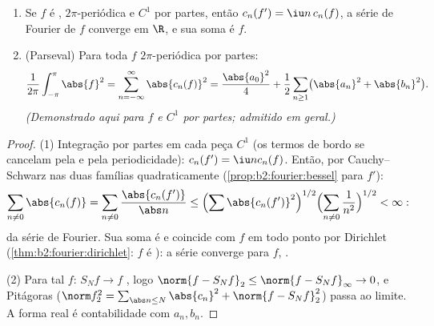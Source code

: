 \begin{theorem}\label{thm:b2:fourier:parseval}
\begin{enumerate}
  \item Se $f$ é , $2\pi$-periódica e $C^1$ por partes,
        então $c_n(f') = \iu n\,c_n(f)$, a série de Fourier de $f$
        converge \emph{} em $\R$, e sua soma é $f$.
  \item (Parseval) Para toda $f$ $2\pi$-periódica  por
        partes:
        \[
        \frac{1}{2\pi}\int_{-\pi}^{\pi}\abs{f}^2
        = \sum_{n=-\infty}^{\infty} \abs{c_n(f)}^2
        = \frac{\abs{a_0}^2}{4} + \frac12\sum_{n\geq1}
        \bigl(\abs{a_n}^2 + \abs{b_n}^2\bigr).
        \]
        \emph{(Demonstrado aqui para $f$  e $C^1$ por partes;
        admitido em geral.)}
\end{enumerate}
\end{theorem}

\begin{proof}
(1) Integração por partes em cada peça $C^1$ (os termos de bordo se cancelam
pela  e pela periodicidade): $c_n(f') = \iu n c_n(f)$. Então, por
Cauchy--Schwarz nas duas famílias quadraticamente 
(\cref{prop:b2:fourier:bessel} para $f'$):
\[
\sum_{n \neq 0} \abs{c_n(f)} = \sum_{n\neq0}
\frac{\abs{c_n(f')}}{\abs n}
\leq \Bigl(\sum \abs{c_n(f')}^2\Bigr)^{1/2}
\Bigl(\sum_{n\neq0}\frac{1}{n^2}\Bigr)^{1/2} < \infty :
\]
 da série de Fourier. Sua soma é  e
coincide com $f$ em todo ponto por Dirichlet
(\cref{thm:b2:fourier:dirichlet}: $f$ é ): a série
converge para $f$, .

(2) Para tal $f$: $S_N f \to f$ , logo $\norm{f - S_Nf}_2
\leq \norm{f - S_Nf}_\infty \to 0$, e Pitágoras
($\norm f_2^2 = \sum_{\abs n \leq N}\abs{c_n}^2 + \norm{f -
S_Nf}_2^2$) passa ao limite. A forma real é contabilidade com
$a_n, b_n$.
\end{proof}

